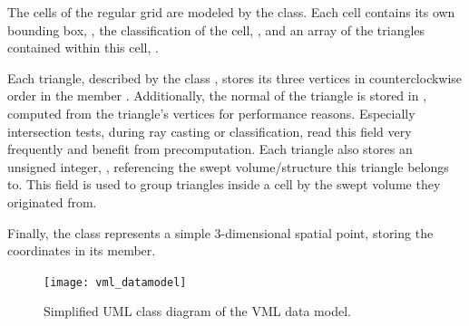 The cells of the regular grid are modeled by the  class.
Each cell contains its own bounding box, , the classification of the cell, , and an array of the triangles contained within this cell, .

Each triangle, described by the class , stores its three vertices in counterclockwise order in the member .
Additionally, the normal of the triangle is stored in , computed from the triangle's vertices for performance reasons.
Especially intersection tests, \eg during ray casting or classification, read this field very frequently and benefit from precomputation.
Each triangle also stores an unsigned integer, , referencing the swept volume/structure this triangle belongs to.
This field is used to group triangles inside a cell by the swept volume they originated from.

Finally, the  class represents a simple 3-dimensional spatial point, storing the coordinates in its  member.

\begin{figure}
	\centering
	\texttt{[image: vml\_datamodel]}
	\caption{
		Simplified UML class diagram of the VML data model.
	}
	\label{fig:vml_datamodel}
\end{figure}
